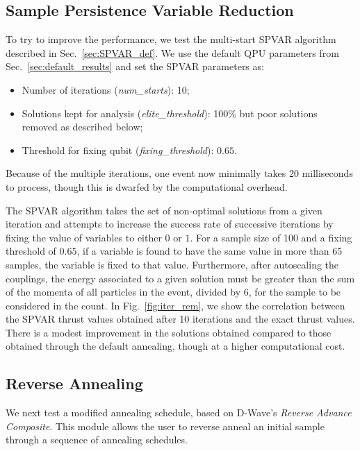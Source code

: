 \documentclass[aps,prd,twocolumn,superscriptaddress,preprintnumbers,nofootinbib,longbibliography,floatfix]{revtex4-1}
\DeclareRobustCommand{\Sec}[1]{Sec.~\ref{sec:#1}}
\DeclareRobustCommand{\Fig}[1]{Fig.~\ref{fig:#1}}
\begin{document}
\subsection{Sample Persistence Variable Reduction}
\label{sec:SPVAR_results}


To try to improve the performance, we test the multi-start SPVAR algorithm described in \Sec{SPVAR_def}.
%
We use the default QPU parameters from \Sec{default_results} and set the SPVAR parameters as:
%
\begin{itemize}
    \item Number of iterations (\textit{num\_starts}):  10; 
    \item Solutions kept for analysis (\textit{elite\_threshold}): 100\% but poor solutions removed as described below;
    \item Threshold for fixing qubit (\textit{fixing\_threshold}):  $0.65$.
\end{itemize}
%
Because of the multiple iterations, one event now minimally takes 20 milliseconds to process, though this is dwarfed by the computational overhead.


The SPVAR algorithm takes the set of non-optimal solutions from a given iteration and attempts to increase the success rate of successive iterations by fixing the value of variables to either $0$ or $1$.
%
For a sample size of 100 and a fixing threshold of $0.65$, if a variable is found to have the same value in more than 65 samples, the variable is fixed to that value.
%
Furthermore, after autoscaling the couplings, the energy associated to a given solution must be greater than the sum of the momenta of all particles in the event, divided by 6, for the sample to be considered in the count.
%
In \Fig{iter_rem}, we show the correlation between the SPVAR thrust values obtained after 10 iterations and the exact thrust values.
%
There is a modest improvement in the solutions obtained compared to those obtained through the default annealing, though at a higher computational cost.


\subsection{Reverse Annealing}
\label{sec:reverse_results}

We next test a modified annealing schedule, based on D-Wave's \textit{Reverse Advance Composite}.
%
This module allows the user to {reverse anneal} an initial sample through a sequence of annealing schedules.
\end{document}
